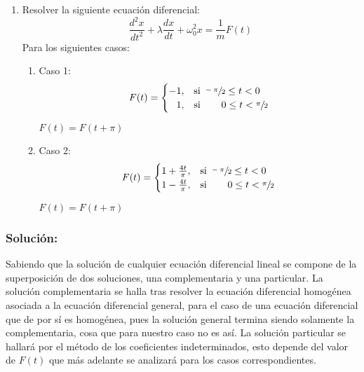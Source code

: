 \begin{multicols}{2}
\begin{enumerate}[leftmargin=15pt]
    \item Resolver la siguiente ecuación diferencial:
    \begin{equation*}
        \frac{d^{2}x}{dt^{2}} + \lambda \frac{dx}{dt} + \omega_{0}^{2}x = \frac{1}{m} F(t)
    \end{equation*}
    Para los siguientes casos:
    \begin{enumerate}
        \item Caso 1:
        \begin{equation*}
            F(t) =
            \begin{cases}
            -1,&\text{si } \sfrac{-\pi}{2} \leq t < 0\\
            \hphantom{-}1,&\text{si } \hspace{18pt} 0 \leq t < \sfrac{\pi}{2}
            \end{cases}
        \end{equation*}
        \begin{center}$F(t)=F(t+\pi)$\end{center}
        \item Caso 2:
        \begin{equation*}
            F(t) =
            \begin{cases}
            1 + \frac{4t}{\pi},&\text{si } \sfrac{-\pi}{2} \leq t < 0\\
            1 - \frac{4t}{\pi},&\text{si } \hspace{18pt} 0 \leq t < \sfrac{\pi}{2}
            \end{cases}
        \end{equation*}
        \begin{center}$F(t)=F(t+\pi)$\end{center}
    \end{enumerate}
\end{enumerate}

\subsubsection*{Solución:}

Sabiendo que la solución de cualquier ecuación diferencial lineal se compone de la superposición de dos soluciones, una complementaria y una particular. La solución complementaria se halla tras resolver la ecuación diferencial homogénea asociada a la ecuación diferencial general, para el caso de una ecuación diferencial que de por sí es homogénea, pues la solución general termina siendo solamente la complementaria, cosa que para nuestro caso no es así. La solución particular se hallará por el método de los coeficientes indeterminados, esto depende del valor de $F(t)$ que más adelante se analizará para los casos correspondientes.


\end{multicols}

